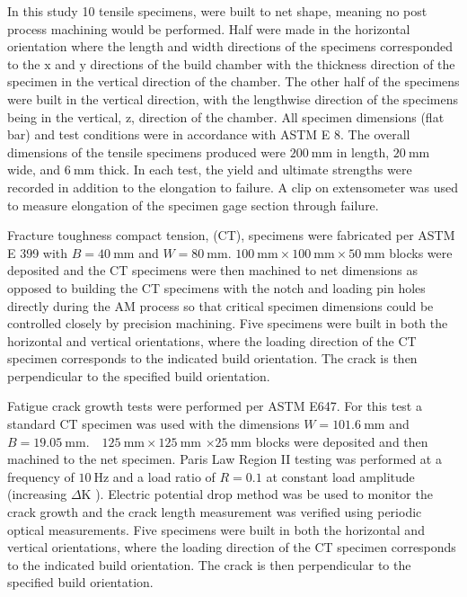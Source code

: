 \documentclass[10pt]{article}
\begin{document}
In this study 10 tensile specimens, were built to net shape, meaning no post process machining would be performed. Half were made in the horizontal orientation where the length and width directions of the specimens corresponded to the $\mathrm{x}$ and $\mathrm{y}$ directions of the build chamber with the thickness direction of the specimen in the vertical direction of the chamber. The other half of the specimens were built in the vertical direction, with the lengthwise direction of the specimens being in the vertical, $\mathrm{z}$, direction of the chamber. All specimen dimensions (flat bar) and test conditions were in accordance with ASTM E 8. The overall dimensions of the tensile specimens produced were $200 \mathrm{~mm}$ in length, $20 \mathrm{~mm}$ wide, and $6 \mathrm{~mm}$ thick. In each test, the yield and ultimate strengths were recorded in addition to the elongation to failure. A clip on extensometer was used to measure elongation of the specimen gage section through failure.

Fracture toughness compact tension, (CT), specimens were fabricated per ASTM E 399 with $B=40 \mathrm{~mm}$ and $W=80 \mathrm{~mm}$. $100 \mathrm{~mm} \times 100 \mathrm{~mm} \times 50 \mathrm{~mm}$ blocks were deposited and the CT specimens were then machined to net dimensions as opposed to building the CT specimens with the notch and loading pin holes directly during the AM process so that critical specimen dimensions could be controlled closely by precision machining. Five specimens were built in both the horizontal and vertical orientations, where the loading direction of the CT specimen corresponds to the indicated build orientation. The crack is then perpendicular to the specified build orientation.

Fatigue crack growth tests were performed per ASTM E647. For this test a standard CT specimen was used with the dimensions $W=101.6 \mathrm{~mm}$ and $B=19.05 \mathrm{~mm} . \quad 125 \mathrm{~mm} \times 125 \mathrm{~mm}$ $\times 25 \mathrm{~mm}$ blocks were deposited and then machined to the net specimen. Paris Law Region II testing was performed at a frequency of $10 \mathrm{~Hz}$ and a load ratio of $R=0.1$ at constant load amplitude (increasing $\Delta \mathrm{K}$ ). Electric potential drop method was be used to monitor the crack growth and the crack length measurement was verified using periodic optical measurements. Five specimens were built in both the horizontal and vertical orientations, where the loading direction of the CT specimen corresponds to the indicated build orientation. The crack is then perpendicular to the specified build orientation.
\end{document}
